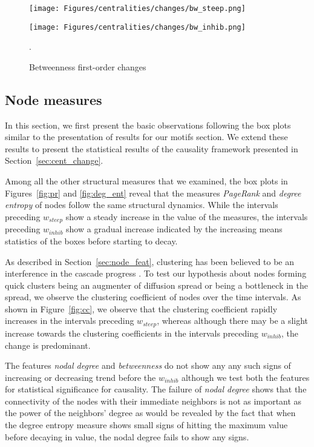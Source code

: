 \documentclass[smallextended]{svjour3}       %
\theoremstyle{definition}
\begin{document}
\begin{figure}[]
	\centering
	\hfill
	\begin{minipage}{0.50\textwidth}%
		\texttt{[image: Figures/centralities/changes/bw\_steep.png]}
		\hspace*{2cm}\subcaption{}
	\end{minipage}
	\hfill
	\begin{minipage}{0.40\textwidth}
		\texttt{[image: Figures/centralities/changes/bw\_inhib.png]}
		\hspace*{2cm}\subcaption{}
	\end{minipage}
	\hfill
	\caption{Betweenness first-order changes}. 
	\label{fig:bw_change}
\end{figure}

\subsection{Node measures}

In this section, we first present the basic observations following the box plots 
similar to the presentation of results for our motifs section. We extend these results to present the statistical results of the causality framework presented in Section~\ref{sec:cent_change}. 

Among all the other structural measures that we examined, the box plots in Figures~\ref{fig:pr} and \ref{fig:deg_ent} reveal that the measures \textit{PageRank} and \textit{degree entropy} of nodes follow the same structural dynamics. While the intervals preceding $w_{steep}$ show a steady increase in the value of the measures, the intervals preceding $w_{inhib} $ show a gradual increase indicated by the increasing means statistics of the boxes before starting to decay. 

As described in Section~\ref{sec:node_feat}, clustering has been believed to be an interference in the cascade progress \cite{cluster_inhibit}. To test our hypothesis about nodes forming quick clusters being an augmenter of diffusion spread or being a bottleneck in the spread, we observe the clustering coefficient of nodes over the time intervals. As shown in Figure~\ref{fig:cc}, we observe that the clustering coefficient rapidly increases in the intervals preceding $w_{steep}$, whereas
although there may be a slight increase towards the clustering coefficients in the intervals preceding $w_{inhib}$, the change is predominant. 

The features \textit{nodal degree} and \textit{betweenness} do not show any any such signs of increasing or decreasing trend before the $w_{inhib}$ although we test both the features for statistical significance for causality. The failure of \textit{nodal degree} shows that the connectivity of the nodes with their immediate neighbors is not as important as the power of the neighbors' degree as would be revealed by the fact that when the degree entropy measure shows small signs of hitting the maximum value before decaying in value, the nodal degree fails to show any signs.
\end{document}
